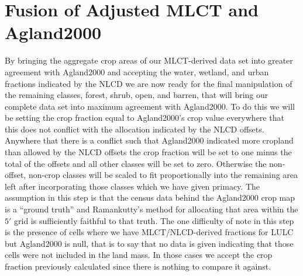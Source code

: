 \section{Fusion of Adjusted MLCT and Agland2000}
\label{sec:fusion}



By bringing the aggregate crop areas of our MLCT-derived data set into
greater agreement with Agland2000 and accepting the water, wetland,
and urban fractions indicated by the NLCD we are now ready for the
final manipulation of the remaining classes, forest, shrub, open, and
barren, that will bring our complete data set into maximum agreement
with Agland2000.  To do this we will be setting the crop fraction
equal to Agland2000's crop value everywhere that this does not
conflict with the allocation indicated by the NLCD offsets.  Anywhere
that there is a conflict such that Agland2000 indicated more cropland
than allowed by the NLCD offsets the crop fraction will be set to one
minus the total of the offsets and all other classes will be set to
zero.  Otherwise the non-offset, non-crop classes will be scaled to
fit proportionally into the remaining area left after incorporating
those classes which we have given primacy.  The assumption in this step
is that the census data behind the Agland2000 crop map is a ``ground
truth'' and Ramankutty's method for allocating that area within the
$5'$ grid is sufficiently faithful to that truth.  The one difficulty
of note in this step is the presence of cells where we have
MLCT/NLCD-derived fractions for LULC but Agland2000 is null, that is
to say that no data is given indicating that those cells were not
included in the land mass.  In those cases we accept the crop fraction
previously calculated since there is nothing to compare it against.


